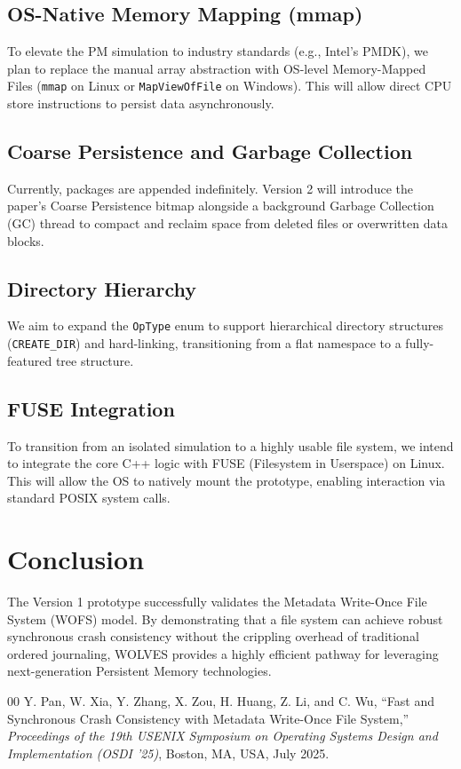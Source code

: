 \documentclass[conference]{IEEEtran}
\begin{document}
\subsection{OS-Native Memory Mapping (mmap)}
To elevate the PM simulation to industry standards (e.g., Intel's PMDK), we plan to replace the manual array abstraction with OS-level Memory-Mapped Files (\texttt{mmap} on Linux or \texttt{MapViewOfFile} on Windows). This will allow direct CPU store instructions to persist data asynchronously.

\subsection{Coarse Persistence and Garbage Collection}
Currently, packages are appended indefinitely. Version 2 will introduce the paper's Coarse Persistence bitmap alongside a background Garbage Collection (GC) thread to compact and reclaim space from deleted files or overwritten data blocks.

\subsection{Directory Hierarchy}
We aim to expand the \texttt{OpType} enum to support hierarchical directory structures (\texttt{CREATE\_DIR}) and hard-linking, transitioning from a flat namespace to a fully-featured tree structure.

\subsection{FUSE Integration}
To transition from an isolated simulation to a highly usable file system, we intend to integrate the core C++ logic with FUSE (Filesystem in Userspace) on Linux. This will allow the OS to natively mount the prototype, enabling interaction via standard POSIX system calls.

\section{Conclusion}
The Version 1 prototype successfully validates the Metadata Write-Once File System (WOFS) model. By demonstrating that a file system can achieve robust synchronous crash consistency without the crippling overhead of traditional ordered journaling, WOLVES provides a highly efficient pathway for leveraging next-generation Persistent Memory technologies.

\begin{thebibliography}{00}
 Y. Pan, W. Xia, Y. Zhang, X. Zou, H. Huang, Z. Li, and C. Wu, ``Fast and Synchronous Crash Consistency with Metadata Write-Once File System,'' \emph{Proceedings of the 19th USENIX Symposium on Operating Systems Design and Implementation (OSDI '25)}, Boston, MA, USA, July 2025.
\end{thebibliography}
\end{document}
